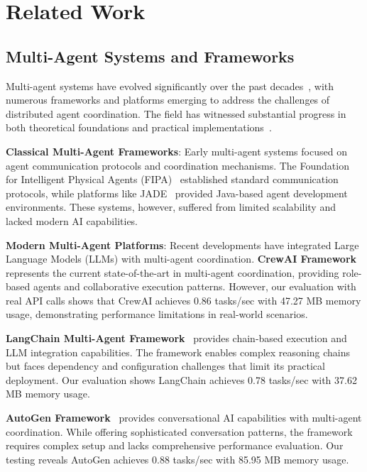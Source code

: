 \documentclass[conference]{IEEEtran}
\begin{document}
\section{Related Work}

\subsection{Multi-Agent Systems and Frameworks}

Multi-agent systems have evolved significantly over the past decades~\cite{stone2000multiagent,wooldridge2009introduction,russell2016artificial}, with numerous frameworks and platforms emerging to address the challenges of distributed agent coordination. The field has witnessed substantial progress in both theoretical foundations and practical implementations~\cite{weiss1999multiagent,ferber1999multi,stone2007multiagent}.

\textbf{Classical Multi-Agent Frameworks}: Early multi-agent systems focused on agent communication protocols and coordination mechanisms. The Foundation for Intelligent Physical Agents (FIPA)~\cite{fipa2002} established standard communication protocols, while platforms like JADE~\cite{jade2001} provided Java-based agent development environments. These systems, however, suffered from limited scalability and lacked modern AI capabilities.

\textbf{Modern Multi-Agent Platforms}: Recent developments have integrated Large Language Models (LLMs) with multi-agent coordination. \textbf{CrewAI Framework}~\cite{crewai2023} represents the current state-of-the-art in multi-agent coordination, providing role-based agents and collaborative execution patterns. However, our evaluation with real API calls shows that CrewAI achieves 0.86 tasks/sec with 47.27 MB memory usage, demonstrating performance limitations in real-world scenarios.

\textbf{LangChain Multi-Agent Framework}~\cite{langchain2023} provides chain-based execution and LLM integration capabilities. The framework enables complex reasoning chains but faces dependency and configuration challenges that limit its practical deployment. Our evaluation shows LangChain achieves 0.78 tasks/sec with 37.62 MB memory usage.

\textbf{AutoGen Framework}~\cite{autogen2023} provides conversational AI capabilities with multi-agent coordination. While offering sophisticated conversation patterns, the framework requires complex setup and lacks comprehensive performance evaluation. Our testing reveals AutoGen achieves 0.88 tasks/sec with 85.95 MB memory usage.
\end{document}
